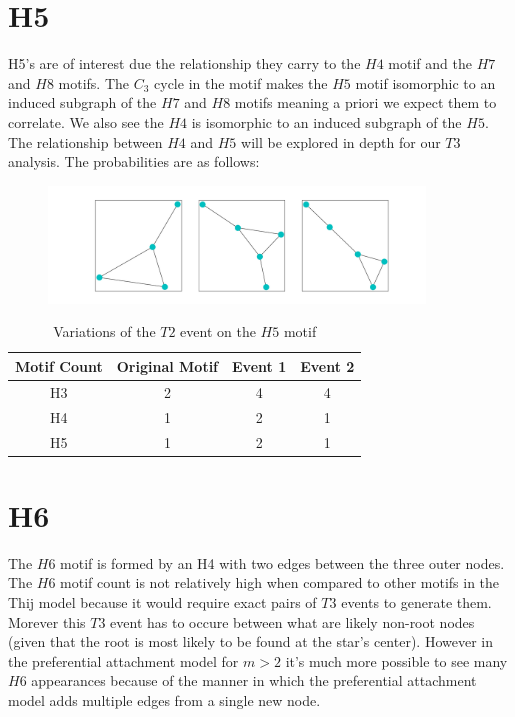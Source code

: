 \FloatBarrier


\section{H5}
H5's are of interest due the relationship they carry to the $H4$ motif and the 
$H7$ and $H8$ motifs. The $C_3$ cycle in the motif makes the $H5$ motif isomorphic to
an induced subgraph of the $H7$ and $H8$ motifs meaning a priori we expect them to correlate. We 
also see the $H4$ is isomorphic to an induced subgraph of the $H5$. The relationship between
$H4$ and $H5$ will be explored in depth for our $T3$ analysis. The probabilities are as follows:



\begin{figure}[!ht]
    \includegraphics[width=10cm]{Images/H5_evolution.png}
    \centering
\end{figure}
\FloatBarrier

\begin{table}
    \centering
    \begin{tabular}{||c c c c||} 
    \hline
    Motif Count & Original Motif & Event 1 & Event 2\\ [0.5ex] 
    \hline\hline
    H3 & 2 & 4 & 4\\ 
    \hline
    H4 & 1 & 2 & 1\\
    \hline
    H5 & 1 & 2 & 1\\
    \hline
   \end{tabular}
   \caption{Variations of the $T2$ event on the $H5$ motif}
    \label{table:3}
\end{table}


\section{H6}
The $H6$ motif is formed by an H4 with two edges between the three outer nodes.
The $H6$ motif count is not relatively high when compared to other motifs in the Thij
model because it would require exact pairs of $T3$ events to generate them. Morever this
$T3$ event has to occure between what are likely non-root nodes (given that the root is most likely to be found 
at the star's center). However in the preferential attachment model for $m>2$
it's much more possible to see many $H6$ appearances because of the manner in which 
the preferential attachment model adds multiple edges from a single new node.

